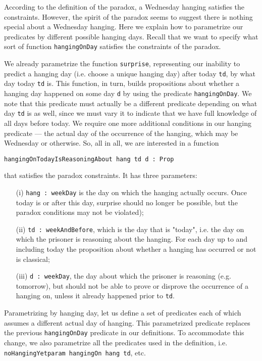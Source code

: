 \documentclass[runningheads]{llncs}
\begin{document}
According to the definition of the paradox, a Wednesday hanging satisfies
the constraints. However, the spirit of the paradox seems to suggest there is nothing
special about a Wednesday hanging. Here we explain how to parametrize our predicates
by different possible hanging days. Recall that we want to specify what sort of
function {\tt hangingOnDay} satisfies the constraints of the paradox.

We already parametrize the function {\tt surprise},
representing our inability to predict a hanging day (i.e. choose a unique hanging day)
after today {\tt td}, by what day today {\tt td} is. This function, in turn, builds propositions
about whether a hanging day happened on some day {\tt d} by using the
predicate {\tt hangingOnDay}. We note that this predicate must actually be a different
predicate depending on what day {\tt td} is as well, since we must vary it to
indicate that we have full knowledge of all days before today.
We require one more additional conditions in our hanging predicate --- the
actual day of the occurrence of the hanging, which may be Wednesday or otherwise.
So, all in all, we are interested in a function \newline

{\tt hangingOnTodayIsReasoningAbout hang td d : Prop} \newline

that satisfies the paradox constraints. It has three parameters:

\begin{itemize}
  \item[(i)] {\tt hang : weekDay} is the day on which the hanging actually occurs.
  Once today is or after this day, surprise should no longer be possible, but the paradox
  conditions may not be violated);
  \item[(ii)] {\tt td : weekAndBefore}, which is the day that is "today", i.e. the day
  on which the prisoner is reasoning about the hanging. For each day up to and including today
  the proposition about whether a hanging has occurred or not is classical;
  \item[(iii)] {\tt d : weekDay}, the day about which the prisoner is reasoning (e.g.
  tomorrow), but should not be able to prove or disprove the occurrence of a hanging on,
  unless it already happened prior to {\tt td}.
\end{itemize}

Parametrizing by hanging day, let us define a set of predicates
each of which assumes a different actual day of hanging.
This parametrized predicate replaces the previous {\tt hangingOnDay} predicate
in our definitions.
To accommodate this change, we also parametrize all
the predicates used in the definition, i.e. {\tt noHangingYetparam hangingOn hang td}, etc.
\end{document}
